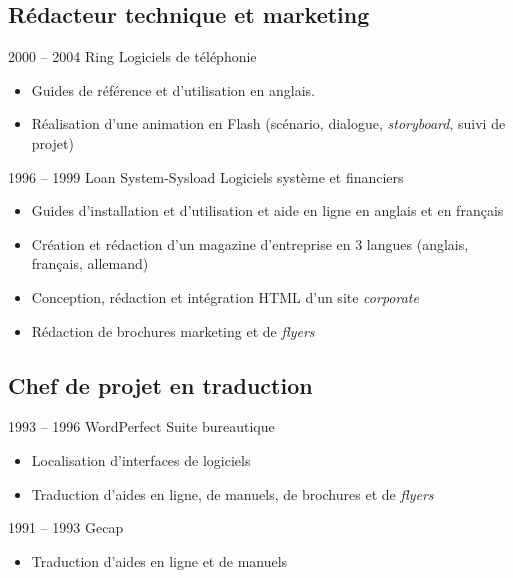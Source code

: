 \documentclass[12pt,a4paper,roman]{moderncv}
\begin{document}
\subsection{Rédacteur technique et marketing}

\cventry
    {2000 – 2004}
    {Ring}
    {Logiciels de téléphonie}
    {}
    {}
    {
      \begin{itemize}
      \item Guides de référence et d'utilisation en anglais.
      \item Réalisation d'une animation en Flash (scénario, dialogue,
        \textit{storyboard}, suivi de projet)
    \end{itemize}}


\cventry
    {1996 – 1999}
    {Loan System-Sysload}
    {Logiciels système et financiers}
    {}
    {}
    {
      \begin{itemize}
      \item Guides d'installation et d'utilisation et aide en ligne en anglais
        et en français
      \item Création et rédaction d'un magazine d'entreprise en 3 langues
        (anglais, français, allemand)
      \item Conception, rédaction et intégration HTML d'un site
        \textit{corporate}
      \item Rédaction de brochures marketing et de \textit{flyers}
      \end{itemize}
    }


\subsection{Chef de projet en traduction}

\cventry
    {1993 – 1996}
    {WordPerfect}
    {Suite bureautique}
    {}
    {}
    {
      \begin{itemize}
      \item Localisation d'interfaces de logiciels
      \item Traduction d'aides en ligne, de manuels, de brochures et de
        \textit{flyers}
      \end{itemize}
    }


\cventry
    {1991 – 1993}
    {Gecap}
    {}
    {}
    {}
    {
      \begin{itemize}
      \item Traduction d'aides en ligne et de manuels
      \end{itemize}
    }
\end{document}
